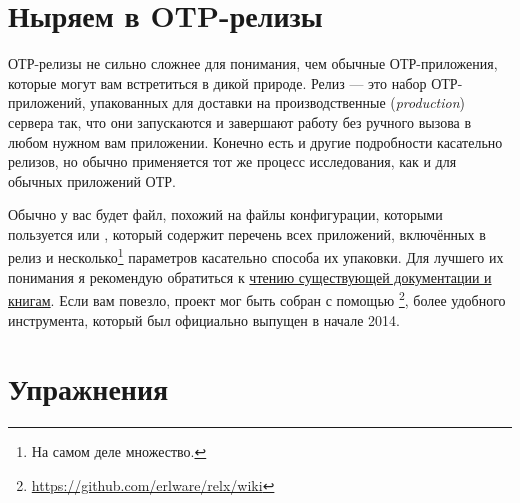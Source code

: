 \FloatBarrier

\section{Ныряем в OTP-релизы}
\label{sec:dive-otp-releases}

ОТР-релизы не сильно сложнее для понимания, чем обычные ОТР-приложения, которые могут вам встретиться в дикой природе. Релиз --- это набор ОТР-приложений, упакованных для доставки на производственные (\emph{production}) сервера так, что они запускаются и завершают работу без ручного вызова  в любом нужном вам приложении. Конечно есть и другие подробности касательно релизов, но обычно применяется тот же процесс исследования, как и для обычных приложений ОТР.

Обычно у вас будет файл, похожий на файлы конфигурации, которыми пользуется   или , который содержит перечень всех приложений, включённых в релиз и несколько\footnote{На самом деле множество.} параметров касательно способа их упаковки. Для лучшего их понимания я рекомендую обратиться к  \href{http://learnyousomeerlang.com/release-is-the-word}{чтению существующей документации и книгам}. Если вам повезло, проект мог быть собран с помощью \footnote{\href{https://github.com/erlware/relx/wiki}{https://github.com/erlware/relx/wiki}}, более удобного инструмента, который был официально выпущен в начале 2014.


\section{Упражнения}

